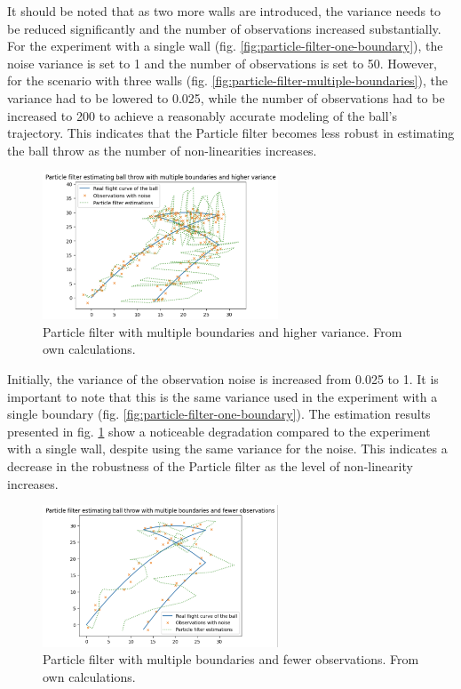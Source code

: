 \documentclass[conference]{IEEEtran}
\begin{document}
It should be noted that as two more walls are introduced, the variance needs to be reduced significantly and the number of observations increased substantially.
For the experiment with a single wall (fig. \ref{fig:particle-filter-one-boundary}), the noise variance is set to 1 and the number of observations is set to 50.
However, for the scenario with three walls (fig. \ref{fig:particle-filter-multiple-boundaries}), the variance had to be lowered to 0.025, while the number of observations had to be increased to 200 to achieve a reasonably accurate modeling of the ball's trajectory.
This indicates that the Particle filter becomes less robust in estimating the ball throw as the number of non-linearities increases.

\begin{figure}
	\centering
	\includegraphics[width=70mm]{figs/particle-filter-multiple-boundaries-higher-variance}
	\caption{Particle filter with multiple boundaries and higher variance. From own calculations.}
	\label{fig:particle-filter-multiple-boundaries-higher-variance}
\end{figure}

Initially, the variance of the observation noise is increased from 0.025 to 1.
It is important to note that this is the same variance used in the experiment with a single boundary (fig. \ref{fig:particle-filter-one-boundary}).
The estimation results presented in fig. \ref{fig:particle-filter-multiple-boundaries-higher-variance} show a noticeable degradation compared to the experiment with a single wall, despite using the same variance for the noise.
This indicates a decrease in the robustness of the Particle filter as the level of non-linearity increases.

\begin{figure}
	\centering
	\includegraphics[width=70mm]{figs/particle-filter-multiple-boundaries-fewer-observations}
	\caption{Particle filter with multiple boundaries and fewer observations. From own calculations.}
	\label{fig:particle-filter-multiple-boundaries-fewer-observations}
\end{figure}
\end{document}
